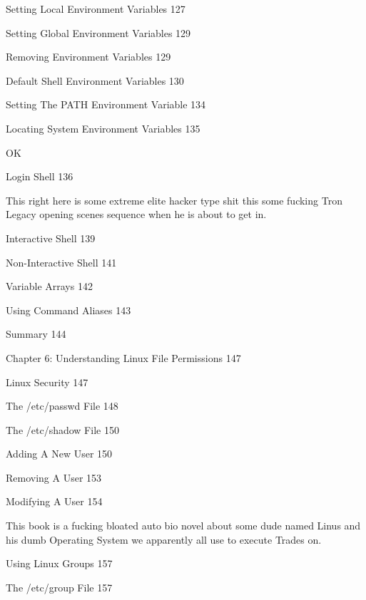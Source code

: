 Setting Local Environment Variables 127



Setting Global Environment Variables 129



Removing Environment Variables 129



Default Shell Environment Variables 130



Setting The PATH Environment Variable 134



Locating System Environment Variables 135

OK

Login Shell 136

This right here is some extreme elite hacker type shit this some fucking Tron Legacy opening scenes sequence when he is about to get in.

Interactive Shell 139



Non-Interactive Shell 141



Variable Arrays 142



Using Command Aliases 143



Summary 144



Chapter 6: Understanding Linux File Permissions 147



Linux Security 147



The /etc/passwd File 148



The /etc/shadow File 150



Adding A New User 150



Removing A User 153



Modifying A User 154

This book is a fucking bloated auto bio novel about some dude named Linus and his dumb Operating System we apparently all use to execute Trades on.

Using Linux Groups 157



The /etc/group File 157



